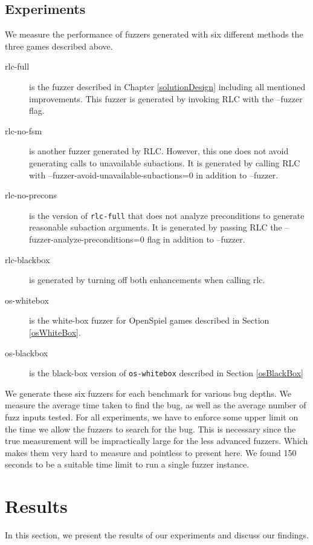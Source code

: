 \subsection{Experiments}
We measure the performance of fuzzers generated with six different methods the three games described above.
\begin{description}
    \item[rlc-full] is the fuzzer described in Chapter \ref{solutionDesign} including all mentioned improvements.
    This fuzzer is generated by invoking RLC with the --fuzzer flag.
    \item[rlc-no-fsm] is another fuzzer generated by RLC. However, this one does not avoid generating calls to unavailable subactions.
    It is generated by calling RLC with --fuzzer-avoid-unavailable-subactions=0 in addition to --fuzzer.
    \item[rlc-no-precons] is the version of \texttt{rlc-full} that does not analyze preconditions to generate reasonable subaction arguments.
    It is generated by passing RLC the --fuzzer-analyze-preconditions=0 flag in addition to --fuzzer.
    \item[rlc-blackbox] is generated by turning off both enhancements when calling rlc.
    \item[os-whitebox] is the white-box fuzzer for OpenSpiel games described in Section \ref{osWhiteBox}.
    \item[os-blackbox] is the black-box version of \texttt{os-whitebox} described in Section \ref{osBlackBox}
\end{description}

We generate these six fuzzers for each benchmark for various bug depths.
We measure the average time taken to find the bug, as well as the average number of fuzz inputs tested.
For all experiments, we have to enforce some upper limit on the time we allow the fuzzers to search for the bug.
This is necessary since the true measurement will be impractically large for the less advanced fuzzers.
Which makes them very hard to measure and pointless to present here.
We found 150 seconds to be a suitable time limit to run a single fuzzer instance.

\section{Results}
In this section, we present the results of our experiments and discuss our findings.
